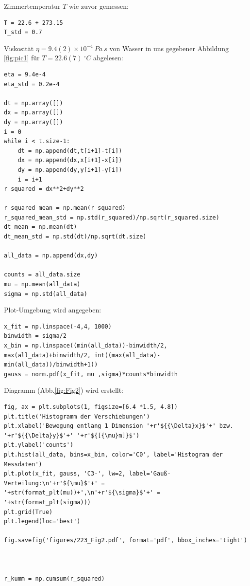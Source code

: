 \documentclass[a4paper,10pt]{article}
\begin{document}
Zimmertemperatur \(T\) wie zuvor gemessen: \begin{lstlisting}
T = 22.6 + 273.15 
T_std = 0.7

\end{lstlisting}

Viskosität \(\eta=9.4(2)\times10^{-4}\:Pa\:s\) von Wasser in uns gegebener Abbildung \ref{fig:pic1} für \(T =22.6(7)\:^{\circ}C\) abgelesen: \begin{lstlisting}
eta = 9.4e-4
eta_std = 0.2e-4

dt = np.array([])
dx = np.array([])
dy = np.array([])
i = 0
while i < t.size-1:
    dt = np.append(dt,t[i+1]-t[i])
    dx = np.append(dx,x[i+1]-x[i])
    dy = np.append(dy,y[i+1]-y[i])
    i = i+1
r_squared = dx**2+dy**2

r_squared_mean = np.mean(r_squared)
r_squared_mean_std = np.std(r_squared)/np.sqrt(r_squared.size)
dt_mean = np.mean(dt)
dt_mean_std = np.std(dt)/np.sqrt(dt.size)

all_data = np.append(dx,dy)

counts = all_data.size
mu = np.mean(all_data)
sigma = np.std(all_data)

\end{lstlisting}

Plot-Umgebung wird angegeben:\begin{lstlisting}
x_fit = np.linspace(-4,4, 1000)
binwidth = sigma/2
x_bin = np.linspace((min(all_data))-binwidth/2, max(all_data)+binwidth/2, int((max(all_data)-min(all_data))/binwidth+1))
gauss = norm.pdf(x_fit, mu ,sigma)*counts*binwidth

\end{lstlisting}

Diagramm (Abb.\ref{fig:Fig2}) wird erstellt:\begin{lstlisting}
fig, ax = plt.subplots(1, figsize=[6.4 *1.5, 4.8])
plt.title('Histogramm der Verschiebungen')
plt.xlabel('Bewegung entlang 1 Dimension '+r'${{\Delta}x}$'+' bzw. '+r'${{\Delta}y}$'+' '+r'${[{\mu}m]}$')
plt.ylabel('counts')
plt.hist(all_data, bins=x_bin, color='C0', label='Histogram der Messdaten')
plt.plot(x_fit, gauss, 'C3-', lw=2, label='Gauß-Verteilung:\n'+r'${\mu}$'+' = '+str(format_plt(mu))+',\n'+r'${\sigma}$'+' = '+str(format_plt(sigma)))
plt.grid(True)
plt.legend(loc='best')

fig.savefig('figures/223_Fig2.pdf', format='pdf', bbox_inches='tight')



r_kumm = np.cumsum(r_squared)

\end{lstlisting}
\end{document}
